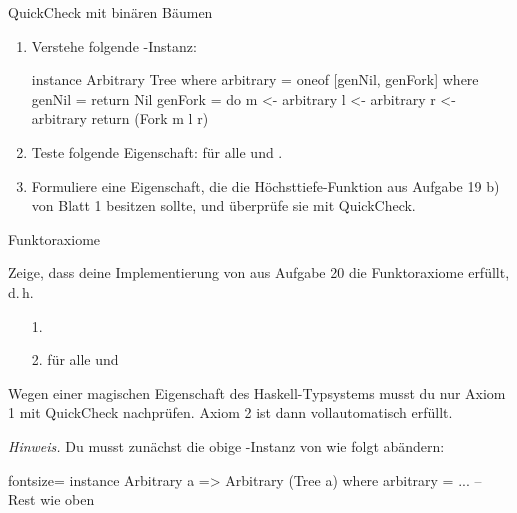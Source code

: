 \documentclass{uebblatt}
\newcommand{\refaufgabe}[1]{#1} %
\begin{document}
\begin{aufgabe}{QuickCheck mit binären Bäumen}
  \begin{enumerate}
    \item Verstehe folgende -Instanz:
\begin{haskellcode}
instance Arbitrary Tree where
  arbitrary = oneof [genNil, genFork]
    where
      genNil = return Nil
      genFork = do
        m <- arbitrary
        l <- arbitrary
        r <- arbitrary
        return (Fork m l r)
\end{haskellcode}

    \item Teste folgende Eigenschaft:
    für alle  und .
    
    \item Formuliere eine Eigenschaft, die die Höchsttiefe-Funktion aus Aufgabe \refaufgabe{19} b) von Blatt 1 besitzen sollte, und überprüfe sie mit QuickCheck.
  \end{enumerate}
\end{aufgabe}

\begin{aufgabe}{Funktoraxiome}
  
  Zeige, dass deine Implementierung von  aus Aufgabe \refaufgabe{20} die Funktoraxiome erfüllt, d.\,h.
  
  \begin{enumerate}
    \item[1.] 
    \item[2.]  für alle  und 
  \end{enumerate}
  
  Wegen einer magischen Eigenschaft des Haskell-Typsystems musst du nur Axiom 1
  mit QuickCheck nachprüfen. Axiom 2 ist dann vollautomatisch erfüllt.

  {\scriptsize \emph{Hinweis.} Du musst zunächst die obige
  -Instanz von
   wie folgt abändern:}

\begin{haskellcode*}{fontsize=\scriptsize}
instance Arbitrary a => Arbitrary (Tree a) where
  arbitrary = ... -- Rest wie oben
\end{haskellcode*}
\end{aufgabe}
\end{document}
